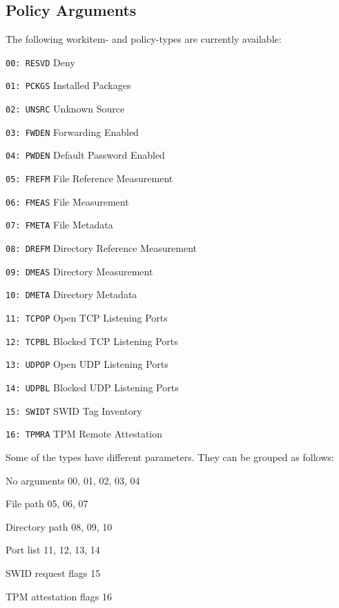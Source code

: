 \documentclass[10pt,a4paper]{scrartcl}
\begin{document}
\subsection{Policy Arguments}

The following workitem- and policy-types are currently available:
\begin{description*}
	\item[\texttt{00: RESVD}] Deny
	\item[\texttt{01: PCKGS}] Installed Packages
	\item[\texttt{02: UNSRC}] Unknown Source
	\item[\texttt{03: FWDEN}] Forwarding Enabled
	\item[\texttt{04: PWDEN}] Default Password Enabled
	\item[\texttt{05: FREFM}] File Reference Measurement
	\item[\texttt{06: FMEAS}] File Measurement 
	\item[\texttt{07: FMETA}] File Metadata
	\item[\texttt{08: DREFM}] Directory Reference Measurement
	\item[\texttt{09: DMEAS}] Directory Measurement
	\item[\texttt{10: DMETA}] Directory Metadata
	\item[\texttt{11: TCPOP}] Open TCP Listening Ports
	\item[\texttt{12: TCPBL}] Blocked TCP Listening Ports
	\item[\texttt{13: UDPOP}] Open UDP Listening Ports
	\item[\texttt{14: UDPBL}] Blocked UDP Listening Ports
	\item[\texttt{15: SWIDT}] SWID Tag Inventory
	\item[\texttt{16: TPMRA}] TPM Remote Attestation
\end{description*}

Some of the types have different parameters. They can be grouped as follows:

\begin{description*}
	\item[No arguments] 00, 01, 02, 03, 04
	\item[File path] 05, 06, 07
	\item[Directory path] 08, 09, 10
	\item[Port list] 11, 12, 13, 14
	\item[SWID request flags] 15
	\item[TPM attestation flags] 16
\end{description*}
\end{document}
